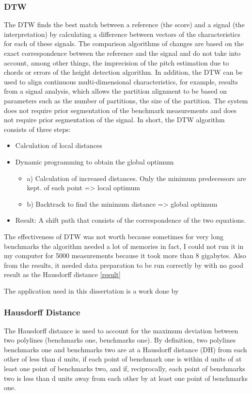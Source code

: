 \documentclass{article}
\begin{document}
\subsubsection{DTW}

 The DTW finds the best match between a reference (the score) and a signal (the interpretation) by calculating a difference between vectors of the characteristics for each of these signals. The comparison algorithms of changes are based on the exact correspondence between the reference and the signal and do not take into account, among other things, the imprecision of the pitch estimation due to chords or errors of the height detection algorithm. In addition, the DTW can be used to align continuous multi-dimensional characteristics, for example, results from a signal analysis, which allows the partition alignment to be based on parameters such as the number of partitions, the size of the partition.
The system does not require prior segmentation of the benchmark measurements and does not require prior segmentation of the
signal.
In short, the DTW algorithm consists of three steps:

\begin{itemize}
    \item Calculation of local distances
    \item Dynamic programming to obtain the global optimum \begin{itemize}
        \item a) Calculation of increased distances. Only the minimum predecessors are kept. of each point => local optimum
        \item b) Backtrack to find the minimum distance => global optimum
    \end{itemize}
    \item Result: A shift path that consists of the correspondence of the two equations.
\end{itemize}

The effectiveness of DTW was not worth because sometimes for very long benchmarks the algorithm needed a lot of memories in fact, I could not run it in my computer for 5000 measurements because it took more than 8 gigabytes.
Also from the results, it needed data preparation to be run correctly by with no good result as the Hausdorff distance \ref{result}

The application used in this dissertation is a work done by \citep{salvador2007toward}

\subsubsection{Hausdorff Distance }
The Hausdorff distance \citep{belogay1997calculating} is used to account for the maximum deviation between two polylines (benchmarks one, benchmarks one). By definition, two polylines benchmarks one and benchmarks two are at a Hausdorff distance (DH) from each other of less than d units, if each point of benchmark one is within d units of at least one point of benchmarks two, and if, reciprocally, each point of benchmarks two is less than d units away from each other by at least one point of benchmarks one.
\end{document}
